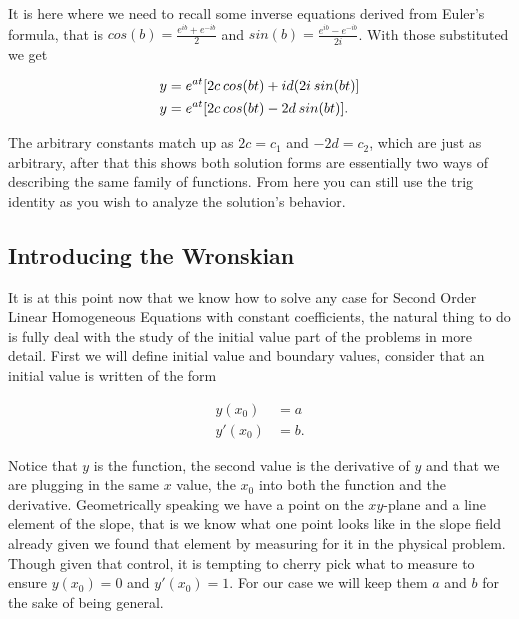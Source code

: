 \documentclass[12pt]{article}
\begin{document}
It is here where we need to recall some inverse equations derived from Euler's formula, that is $cos(b) = \frac{e^{ib}+e^{-ib}}{2}$ and $sin(b) = \frac{e^{ib}-e^{-ib}}{2i}$. With those substituted we get

\begin{align*}
    y &= e^{at}[2c\hspace{2 pt}cos(bt)+id(2i\hspace{2 pt}sin(bt)] \\
    y &= e^{at}[2c\hspace{2 pt}cos(bt)-2d\hspace{2 pt}sin(bt)].
\end{align*}

The arbitrary constants match up as $2c=c_1$ and $-2d=c_2$, which are just as arbitrary, after that this shows both solution forms are essentially two ways of describing the same family of functions. From here you can still use the trig identity as you wish to analyze the solution's behavior.

\subsection{Introducing the Wronskian}

It is at this point now that we know how to solve any case for Second Order Linear Homogeneous Equations with constant coefficients, the natural thing to do is fully deal with the study of the initial value part of the problems in more detail. First we will define initial value and boundary values, consider that an initial value is written of the form

\begin{align*}
    y(x_0) &= a \\
    y'(x_0) &= b.
\end{align*}

Notice that $y$ is the function, the second value is the derivative of $y$ and that we are plugging in the same $x$ value, the $x_0$ into both the function and the derivative. Geometrically speaking we have a point on the $xy$-plane and a line element of the slope, that is we know what one point looks like in the slope field already given we found that element by measuring for it in the physical problem. Though given that control, it is tempting to cherry pick what to measure to ensure $y(x_0)=0$ and $y'(x_0)=1$. For our case we will keep them $a$ and $b$ for the sake of being general. \\
\end{document}
